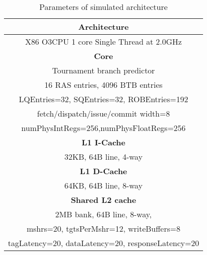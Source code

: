 


\begin{table}[!htbp]
\small
\centering
\begin{tabular}{|c|}
\hline
\textbf{Architecture}  \\ \hline
X86 O3CPU 1 core Single Thread at 2.0GHz \\ \hline

\textbf{Core}  \\ \hline
Tournament branch predictor\\
16 RAS entries, 4096 BTB entries\\
LQEntries=32, SQEntries=32, ROBEntries=192\\
fetch/dispatch/issue/commit width=8\\
numPhysIntRegs=256,numPhysFloatRegs=256 \\ \hline

\textbf{L1 I-Cache}  \\ \hline
32KB, 64B line, 4-way \\ \hline

\textbf{L1 D-Cache}  \\ \hline
64KB, 64B line, 8-way \\ \hline

\textbf{Shared L2 cache}  \\ \hline
2MB bank, 64B line, 8-way,  \\
mshrs=20, tgtsPerMshr=12, writeBuffers=8  \\ 
tagLatency=20, dataLatency=20, responseLatency=20\\ \hline
\end{tabular}
\caption{Parameters of simulated architecture}
  \label{table:GEM5}
\end{table}